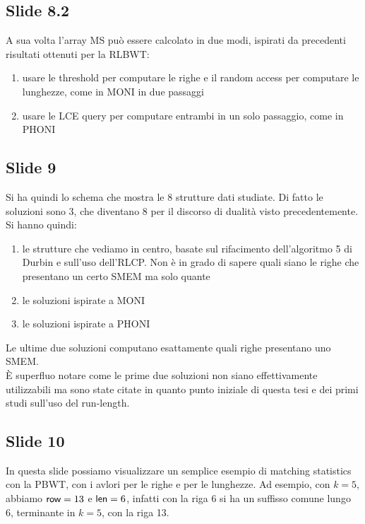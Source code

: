 \documentclass[a4paper,11pt, oneside,italian]{article}
\def\len{\mbox{\rm {\sf len}}}
\def\row{\mbox{\rm {\sf row}}}
\begin{document}
\subsection*{Slide 8.2}
A sua volta l'array MS può essere calcolato in due modi, ispirati da precedenti
risultati ottenuti per la RLBWT:
\begin{enumerate}
  \item usare le threshold per computare le righe e il random access per
  computare le lunghezze, come in MONI in due passaggi
  \item usare le LCE query per computare entrambi in un solo passaggio, come in
  PHONI 
\end{enumerate}
\subsection*{Slide 9}
Si ha quindi lo schema che mostra le 8 strutture dati studiate. Di fatto le
soluzioni sono 3, che diventano 8 per il discorso di dualità visto
precedentemente.
Si hanno quindi:
\begin{enumerate}
  \item le strutture che vediamo in centro, basate sul rifacimento
  dell'algoritmo 5 di Durbin e sull'uso dell'RLCP. Non è in grado di sapere
  quali siano le righe che presentano un certo SMEM ma solo quante
  \item le soluzioni ispirate a MONI
  \item le soluzioni ispirate a PHONI
\end{enumerate}
Le ultime due soluzioni computano esattamente quali righe presentano uno SMEM.\\
È superfluo notare come le prime due soluzioni non siano effettivamente
utilizzabili ma sono state citate in quanto punto iniziale di questa tesi e dei
primi studi sull'uso del run-length.
\subsection*{Slide 10}
In questa slide possiamo visualizzare un semplice esempio di matching statistics
con la PBWT, con i avlori per le righe e per le lunghezze.
Ad esempio, con $k=5$, abbiamo $\row=13$ e $\len=6$, infatti con la riga 6 si ha
un suffisso comune lungo 6, terminante in $k=5$, con la riga 13.
\end{document}
